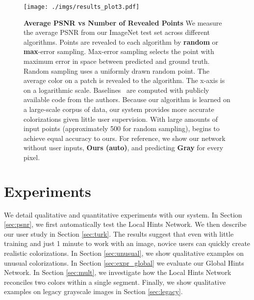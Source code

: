 \documentclass[acmtog,authorversion]{acmart}
\begin{document}
 
\begin{figure}[t!]
\texttt{[image: ./imgs/results\_plot3.pdf]}
\vspace{-6mm}
\caption{\textbf{Average PSNR vs Number of Revealed Points} We measure the average PSNR from our ImageNet test set across different algorithms. Points are revealed to each algorithm by \textbf{random} or \textbf{max}-error sampling. Max-error sampling selects the point with maximum  error in  space between predicted and ground truth. Random sampling uses a uniformly drawn random point. The average color on a  patch is revealed to the algorithm. The x-axis is on a logarithmic scale. Baselines~\cite{levin2004colorization,poole2016fast,endo2016deepprop} are computed with publicly available code from the authors. Because our algorithm is learned on a large-scale corpus of data, our system provides more accurate colorizations given little user supervision. With large amounts of input points (approximately 500 for random sampling), \cite{levin2004colorization} begins to achieve equal accuracy to ours. For reference, we show our network without user inputs, \textbf{Ours (auto)}, and predicting \textbf{Gray} for every pixel.}
\label{fig:psnr-points}
\vspace{-2mm}
\end{figure}

\section{Experiments}
\label{sec:expr}

We detail qualitative and quantitative experiments with our system. In Section \ref{sec:psnr}, we first automatically test the Local Hints Network.
We then describe our user study in Section \ref{sec:turk}. The results suggest that even with little training and just 1 minute to work with an image, novice users can quickly create realistic colorizations. In Section \ref{sec:unusual}, we show qualitative examples on unusual colorizations. In Section \ref{sec:expr_global} we evaluate our Global Hints Network. In Section \ref{sec:mult}, we investigate how the Local Hints Network reconciles two colors within a single segment. Finally, we show qualitative examples on legacy grayscale images in Section \ref{sec:legacy}.
\end{document}
